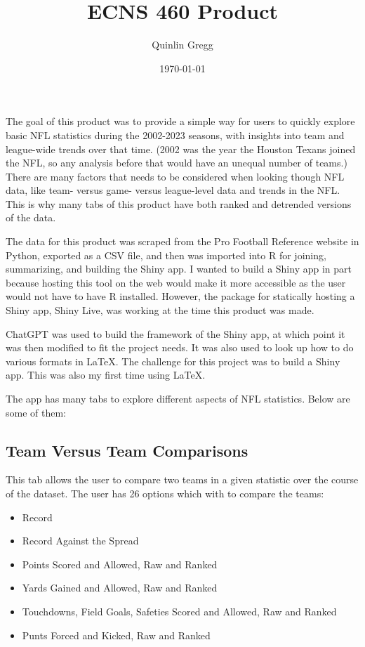 \documentclass{article}
\title{ECNS 460 Product}
\author{Quinlin Gregg}
\date{\today}
\begin{document}
\maketitle

The goal of this product was to provide a simple way for users to quickly explore basic NFL statistics
during the 2002-2023 seasons, with insights into team and league-wide trends over that time.
(2002 was the year the Houston Texans joined the NFL, so any analysis before that would have an unequal
number of teams.) There are many factors that needs to be considered when looking though NFL data,
like team- versus game- versus league-level data and trends in the NFL. This is
why many tabs of this product have both ranked and detrended versions of the data.

The data for this product was scraped from the Pro Football Reference website in Python, exported as
a CSV file, and then was imported into R for joining, summarizing, and building the Shiny app.
I wanted to build a Shiny app in part because hosting this tool on the web would make it
more accessible as the user would not have to have R installed. However, the package for statically
hosting a Shiny app, Shiny Live, was working at the time this product was made.

ChatGPT was used to build the framework of the Shiny app, at which point it was
then modified to fit the project needs. It was also used to look up how to do various
formats in LaTeX. The challenge for this project was to build a Shiny app.
This was also my first time using LaTeX.

The app has many tabs to explore different aspects of NFL statistics. Below are some of them:

\subsection{Team Versus Team Comparisons}

This tab allows the user to compare two teams in a given statistic
over the course of the dataset. The user has 26 options which with to 
compare the teams:

\begin{itemize}
    \item Record
    \item Record Against the Spread
    \item Points Scored and Allowed, Raw and Ranked
    \item Yards Gained and Allowed, Raw and Ranked
    \item Touchdowns, Field Goals, Safeties Scored and Allowed, Raw and Ranked
    \item Punts Forced and Kicked, Raw and Ranked
\end{itemize}
\end{document}
